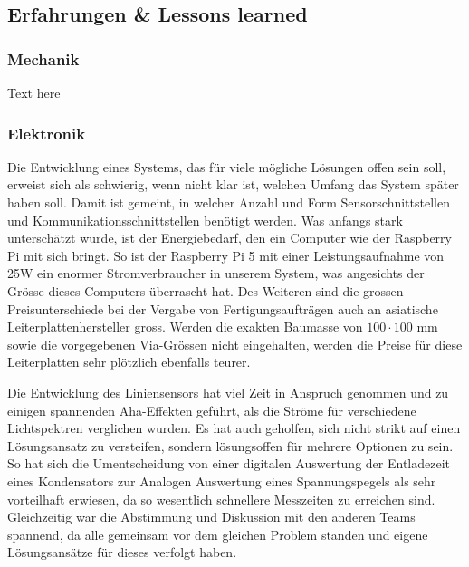 \documentclass[main.tex]{subfiles} %
\begin{document}
\subsection{Erfahrungen \& Lessons learned}

\subsubsection{Mechanik}
Text here

\subsubsection{Elektronik}
Die Entwicklung eines Systems, das für viele mögliche Lösungen offen sein soll,
erweist sich als schwierig, wenn nicht klar ist, welchen Umfang das System
später haben soll. Damit ist gemeint, in welcher Anzahl und Form
Sensorschnittstellen und Kommunikationsschnittstellen benötigt werden. Was
anfangs stark unterschätzt wurde, ist der Energiebedarf, den ein Computer wie
der Raspberry Pi mit sich bringt. So ist der Raspberry Pi 5 mit einer
Leistungsaufnahme von 25W ein enormer Stromverbraucher in unserem System, was
angesichts der Grösse dieses Computers überrascht hat. Des Weiteren sind die
grossen Preisunterschiede bei der Vergabe von Fertigungsaufträgen auch an
asiatische Leiterplattenhersteller gross. Werden die exakten Baumasse von $100
    \cdot 100$ mm sowie die vorgegebenen Via-Grössen nicht eingehalten, werden die
Preise für diese Leiterplatten sehr plötzlich ebenfalls teurer.

Die Entwicklung des Liniensensors hat viel Zeit in Anspruch genommen und zu
einigen spannenden Aha-Effekten geführt, als die Ströme für verschiedene
Lichtspektren verglichen wurden. Es hat auch geholfen, sich nicht strikt auf
einen Lösungsansatz zu versteifen, sondern lösungsoffen für mehrere Optionen zu
sein. So hat sich die Umentscheidung von einer digitalen Auswertung der
Entladezeit eines Kondensators zur Analogen Auswertung eines Spannungspegels
als sehr vorteilhaft erwiesen, da so wesentlich schnellere Messzeiten zu
erreichen sind. Gleichzeitig war die Abstimmung und Diskussion mit den anderen
Teams spannend, da alle gemeinsam vor dem gleichen Problem standen und eigene
Lösungsansätze für dieses verfolgt haben.
\end{document}
